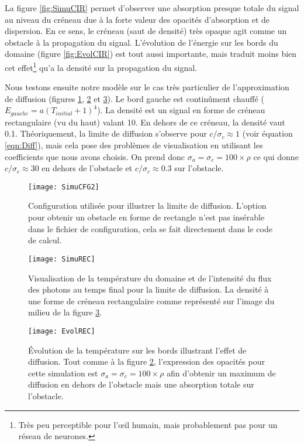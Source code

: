 La figure \ref{fig:SimuCIR} permet d'observer une absorption presque totale du signal au niveau du créneau due à la forte valeur des opacités d'absorption et de dispersion. En ce sens, le créneau (saut de densité) très opaque agit comme un obstacle à la propagation du signal. L'évolution de l'énergie sur les bords du domaine (figure \ref{fig:EvolCIR}) est tout aussi importante, mais traduit moins bien cet effet\footnote{Très peu perceptible pour l'œil humain, mais probablement pas pour un réseau de neurones.} qu'a la densité sur la propagation du signal.

Nous testons ensuite notre modèle sur le cas très particulier de l'approximation de diffusion (figures \ref{fig:SimuCFG2}, \ref{fig:SimuREC} et \ref{fig:EvolREC}). Le bord gauche est continûment chauffé ($E_{gauche} = a(T_{initial}+1)^4$). La densité est un signal en forme de créneau rectangulaire (vu du haut) valant 10. En dehors de ce créneau, la densité vaut 0.1. Théoriquement, la limite de diffusion s'observe pour $c/\sigma_c \approx 1$ (voir équation \ref{eqn:Diff}), mais cela pose des problèmes de visualisation en utilisant les coefficients que nous avons choisis. On prend donc $\sigma_a = \sigma_c = 100 \times \rho$ ce qui donne $c / \sigma_c \approx 30$ en dehors de l'obstacle et $c / \sigma_c \approx 0.3$ sur l'obstacle.

\begin{figure}[!h]
\centering
\texttt{[image: SimuCFG2]} 
\decoRule
\caption[SimuCFG2]{Configuration utilisée pour illustrer la limite de diffusion. L'option pour obtenir un obstacle en forme de rectangle n'est pas insérable dans le fichier de configuration, cela se fait directement dans le code de calcul.}
\label{fig:SimuCFG2}
\end{figure}

\begin{figure}[!h]
\centering
\texttt{[image: SimuREC]} 
\decoRule
\caption[SimuREC]{Visualisation de la température du domaine et de l'intensité du flux des photons au temps final pour la limite de diffusion. La densité à une forme de créneau rectangulaire comme représenté sur l'image du milieu de la figure \ref{fig:EvolREC}.}
\label{fig:SimuREC}
\end{figure}

\begin{figure}[H]
\centering
\texttt{[image: EvolREC]} 
\decoRule
\caption[EvolREC]{Évolution de la température sur les bords illustrant l'effet de diffusion. Tout comme à la figure \ref{fig:SimuREC}, l'expression des opacités pour cette simulation est $\sigma_a = \sigma_c = 100 \times \rho$ afin d'obtenir un maximum de diffusion en dehors de l'obstacle mais une absorption totale sur l'obstacle.}
\label{fig:EvolREC}
\end{figure}

